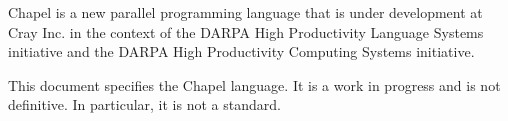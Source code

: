\label{Scope}

Chapel is a new parallel programming language that is under
development at Cray Inc. in the context of the DARPA High Productivity
Language Systems initiative and the DARPA High Productivity Computing
Systems initiative.

This document specifies the Chapel language.  It is a work in progress
and is not definitive.  In particular, it is not a standard.
